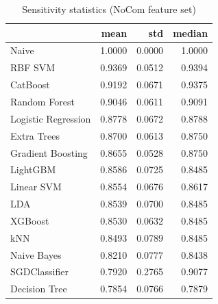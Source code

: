 \begin{table}
\caption{Sensitivity statistics (NoCom feature set)}
\label{tab:sensitivity_NoCom_stats}
\begin{tabular}{lrrr}
\toprule
 & mean & std & median \\
\midrule
Naive & 1.0000 & 0.0000 & 1.0000 \\
RBF SVM & 0.9369 & 0.0512 & 0.9394 \\
CatBoost & 0.9192 & 0.0671 & 0.9375 \\
Random Forest & 0.9046 & 0.0611 & 0.9091 \\
Logistic Regression & 0.8778 & 0.0672 & 0.8788 \\
Extra Trees & 0.8700 & 0.0613 & 0.8750 \\
Gradient Boosting & 0.8655 & 0.0528 & 0.8750 \\
LightGBM & 0.8586 & 0.0725 & 0.8485 \\
Linear SVM & 0.8554 & 0.0676 & 0.8617 \\
LDA & 0.8539 & 0.0700 & 0.8485 \\
XGBoost & 0.8530 & 0.0632 & 0.8485 \\
kNN & 0.8493 & 0.0789 & 0.8485 \\
Naive Bayes & 0.8210 & 0.0777 & 0.8438 \\
SGDClassifier & 0.7920 & 0.2765 & 0.9077 \\
Decision Tree & 0.7854 & 0.0766 & 0.7879 \\
\bottomrule
\end{tabular}
\end{table}
